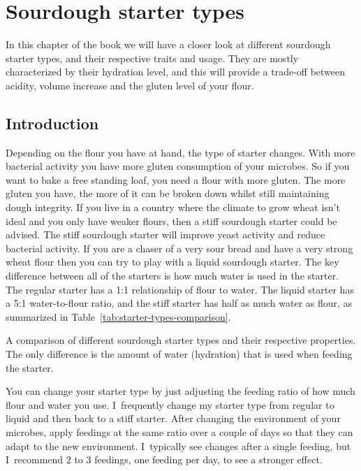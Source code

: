 \chapter{Sourdough starter types}%
\label{ch:starter-types}
\begin{quoting}
In this chapter of the book we will have a closer look
at different sourdough starter types, and their respective
traits and usage. They are mostly characterized by their hydration
level, and this will provide a trade-off between acidity, volume increase and
the gluten level of your flour.
\end{quoting}

\section{Introduction}%
\label{sec:starter-types-intro}

Depending on the flour you have at hand, the type of starter changes. With more
bacterial activity you have more gluten consumption of your microbes. So if
you want to bake a free standing loaf, you need a flour with more gluten. The
more gluten you have, the more of it can be broken down whilst still maintaining
dough integrity. If you live in a country where the climate to grow wheat
isn't ideal and you only have weaker flours, then a stiff sourdough starter
could be advised. The stiff sourdough starter will improve yeast activity and
reduce bacterial activity. If you are a chaser of a very sour bread and have a
very strong wheat flour then you can try to play with a liquid sourdough
starter. The key difference between all of the starters is how much water
is used in the starter. The regular starter has a 1:1 relationship of flour
to water. The liquid starter has a 5:1 water-to-flour ratio, and the stiff
starter has half as much water as flour, as summarized in
Table~\ref{tab:starter-types-comparison}.

\begin{table}[htp!]
    \centering
        
        \caption[Different types of sourdough]{A comparison of different
            sourdough starter types and their respective properties. The only
            difference is the amount of water (hydration) that is used when
            feeding the starter.}%
        \label{tab:starter-types-comparison}
\end{table}

You can change your starter type by just adjusting the feeding ratio of how
much flour and water you use. I~frequently change my starter type from
regular to liquid and then back to a stiff starter. After changing the
environment of your microbes, apply feedings at the same ratio over a couple of
days so that they can adapt to the new environment. I~typically see
changes after a single feeding, but I~recommend 2 to 3 feedings, one feeding per
day, to see a stronger effect.

